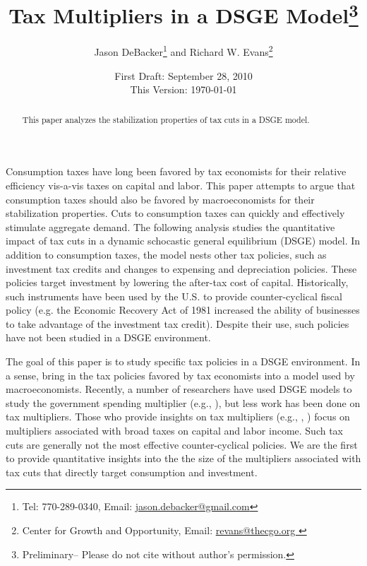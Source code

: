 \documentclass[article,11pt,letterpaper,fleqn]{article}
\author{Jason DeBacker\thanks{Tel: 770-289-0340, Email: \href{mailto: jason.debacker@gmail.com}{jason.debacker@gmail.com}} and Richard W. Evans\thanks{Center for Growth and Opportunity, Email: \href{mailto: revans@thecgo.org}{revans@thecgo.org }}}
\title{Tax Multipliers in a DSGE Model\thanks{Preliminary-- Please do not cite without author's permission.}}
\date{First Draft: September 28, 2010\\ This Version: \today}
\theoremstyle{definition}
\numberwithin{equation}{section}
\newcommand{\cn}{\citeasnoun} %
\begin{document}

\maketitle



\begin{abstract}
This paper analyzes the stabilization properties of tax cuts in a DSGE model.
\end{abstract}








Consumption taxes have long been favored by tax economists for their relative efficiency vis-a-vis taxes on capital and labor.  This paper attempts to argue that consumption taxes should also be favored by macroeconomists for their stabilization properties.  Cuts to consumption taxes can quickly and effectively stimulate aggregate demand. The following analysis studies the quantitative impact of tax cuts in a dynamic schocastic general equilibrium (DSGE) model.  In addition to consumption taxes, the model nests other tax policies, such as investment tax credits and changes to expensing and depreciation policies.  These policies target investment by lowering the after-tax cost of capital.  Historically, such instruments have been used by the U.S. to provide counter-cyclical fiscal policy (e.g. the Economic Recovery Act of 1981 increased the ability of businesses to take advantage of the investment tax credit).  Despite their use, such policies have not been studied in a DSGE environment.

The goal of this paper is to study specific tax policies in a DSGE environment.  In a sense, bring in the tax policies favored by tax economists into a model used by macroeconomists.  Recently, a number of researchers have used DSGE models to study the government spending multiplier (e.g., \cn{CER2010}), but less work has been done on tax multipliers.  Those who provide insights on tax multipliers (e.g., \cn{Zubairy2010}, \cn{IMF2010}) focus on multipliers associated with broad taxes on capital and labor income.  Such tax cuts are generally not the most effective counter-cyclical policies.  We are the first to provide quantitative insights into the the size of the multipliers associated with tax cuts that directly target consumption and investment.
\end{document}
